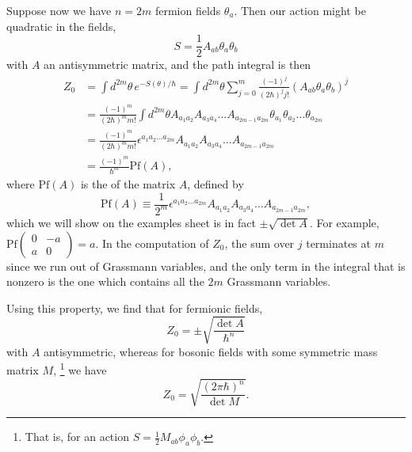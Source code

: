Suppose now we have $n=2m$ fermion fields $\theta_a$. Then our action might be quadratic in the fields,
\begin{equation}
    S=\frac{1}{2} A_{ab} \theta_a \theta_b
\end{equation}
with $A$ an antisymmetric matrix, and the path integral is then
\begin{align*}
    Z_0 &= \int d^{2m}\theta\, e^{-S(\theta)/\hbar} = \int d^{2m} \theta \sum_{j=0}^{m} \frac{(-1)^j}{(2\hbar)^j j!} (A_{ab}\theta_a \theta_b)^j\\
    &= \frac{(-1)^m}{(2\hbar)^m m!} \int d^{2m}\theta A_{a_1 a_2} A_{a_3 a_4} \ldots A_{a_{2m-1} a_{2m}} \theta_{a_1} \theta_{a_2} \ldots \theta_{a_{2m}}\\
    &= \frac{(-1)^m}{(2\hbar)^m m!} \epsilon^{a_1 a_2 \ldots a_{2m}} A_{a_1 a_2} A_{a_3 a_4} \ldots A_{a_{2m-1} a_{2m}}\\
    &= \frac{(-1)^m}{\hbar^m} \text{Pf}(A),
\end{align*}
where $\text{Pf}(A)$ is the  of the matrix $A$, defined by
\begin{equation}
    \text{Pf}(A)\equiv \frac{1}{2^m} \epsilon^{a_1 a_2 \ldots a_{2m}} A_{a_1 a_2} A_{a_3 a_4} \ldots A_{a_{2m-1} a_{2m}},
\end{equation}
which we will show on the examples sheet is in fact $\pm \sqrt{\det A}.$ For example, $\text{Pf}\begin{pmatrix}0 & -a \\ a & 0 \end{pmatrix} = a$. In the computation of $Z_0$, the sum over $j$ terminates at $m$ since we run out of Grassmann variables, and the only term in the integral that is nonzero is the one which contains all the $2m$ Grassmann variables.

Using this property, we find that for fermionic fields,
\begin{equation}
    Z_0 = \pm \sqrt{\frac{\det A}{\hbar^n}}
\end{equation}
with $A$ antisymmetric, whereas for bosonic fields with some symmetric mass matrix $M$,%
    \footnote{That is, for an action $S=\frac{1}{2}M_{ab}\phi_a \phi_b$.}
we have
\begin{equation}
    Z_0=\sqrt{\frac{(2\pi \hbar)^n}{\det M}}.
\end{equation}

